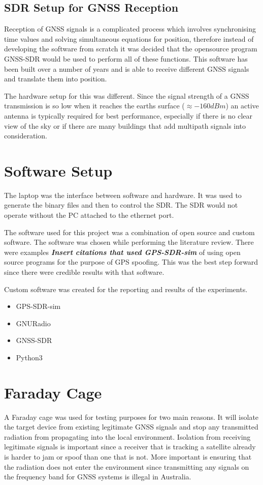 \subsection{SDR Setup for GNSS Reception}
Reception of GNSS signals is a complicated process which involves synchronising time values and solving simultaneous equations for position, therefore instead of
developing the software from scratch it was decided that
the opensource program GNSS-SDR would be used to perform all of these functions. This software has been built over a number of years and is able to receive different GNSS
signals and translate them into position.

The hardware setup for this was different. Since the signal strength of a GNSS transmission is so low when it reaches the earths surface ($\approx -160dBm$) an active
antenna is typically required for best performance, especially if there is no clear view of the sky or if there are many buildings that add multipath signals into
consideration.

\section{Software Setup}
The laptop was the interface between software and hardware. It was used to generate the binary files and then to control the SDR. The SDR would not operate without the
PC attached to the ethernet port.

The software used for this project was a combination of open source and custom software. 
The software was chosen while performing the literature review. There were examples \emph{\textbf{Insert citations that used GPS-SDR-sim}} of using open source programs
for the purpose of GPS spoofing. This was the best step forward since there were credible results with that software.

Custom software was created for the reporting and results of the experiments. 

\begin{itemize}
    \item GPS-SDR-sim
    \item GNURadio
    \item GNSS-SDR
    \item Python3
\end{itemize}

\section{Faraday Cage} \label{sec:FaraCage}
A Faraday cage was used for testing purposes for two main reasons. It will isolate the target device from existing legitimate GNSS signals and stop any transmitted
radiation from propagating into the local environment. Isolation from receiving legitimate signals is important since a receiver that is tracking a satellite already is
harder to jam or spoof than one that is not. More important is ensuring that the radiation does not enter the environment since transmitting any signals on the frequency
band for GNSS systems is illegal in Australia. 

